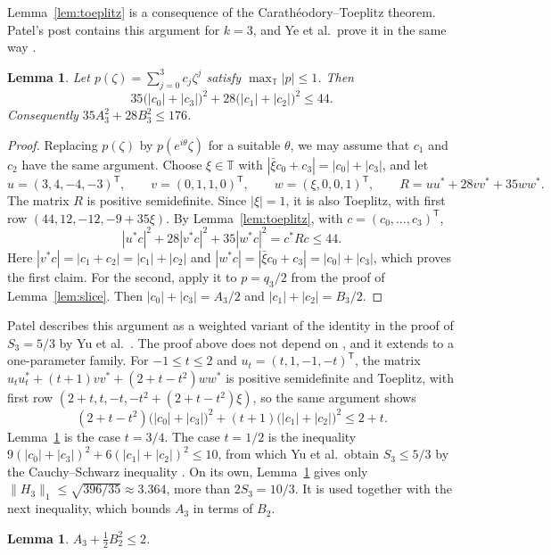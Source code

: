 \documentclass[11pt]{amsart}
\newtheorem{lemma}[theorem]{Lemma}
\theoremstyle{remark}
\numberwithin{equation}{section}
\newcommand{\T}{\mathbb{T}}
\begin{document}
Lemma~\ref{lem:toeplitz} is a consequence of the Carath\'eodory--Toeplitz theorem. Patel's post contains this argument for $k=3$, and Ye et al.\ prove it in the same way \cite[Lemma~3.1]{Ye26}.

\begin{lemma}\label{lem:cubic}
Let $p(\zeta)=\sum_{j=0}^3c_j\zeta^j$ satisfy $\max_\T|p|\le1$. Then
\[
35\bigl(|c_0|+|c_3|\bigr)^2+28\bigl(|c_1|+|c_2|\bigr)^2\le44.
\]
Consequently $35A_3^2+28B_3^2\le176$.
\end{lemma}

\begin{proof}
Replacing $p(\zeta)$ by $p(e^{i\theta}\zeta)$ for a suitable $\theta$, we may assume that $c_1$ and $c_2$ have the same argument. Choose $\xi\in\T$ with $|\bar\xi c_0+c_3|=|c_0|+|c_3|$, and let
\[
u=(3,4,-4,-3)^{\mathsf T},\qquad v=(0,1,1,0)^{\mathsf T},\qquad w=(\xi,0,0,1)^{\mathsf T},\qquad R=uu^*+28vv^*+35ww^*.
\]
The matrix $R$ is positive semidefinite. Since $|\xi|=1$, it is also Toeplitz, with first row $(44,12,-12,-9+35\xi)$. By Lemma~\ref{lem:toeplitz}, with $c=(c_0,\dots,c_3)^{\mathsf T}$,
\[
|u^*c|^2+28|v^*c|^2+35|w^*c|^2=c^*Rc\le44.
\]
Here $|v^*c|=|c_1+c_2|=|c_1|+|c_2|$ and $|w^*c|=|\bar\xi c_0+c_3|=|c_0|+|c_3|$, which proves the first claim. For the second, apply it to $p=q_3/2$ from the proof of Lemma~\ref{lem:slice}. Then $|c_0|+|c_3|=A_3/2$ and $|c_1|+|c_2|=B_3/2$.
\end{proof}

Patel describes this argument as a weighted variant of the identity in the proof of $S_3=5/3$ by Yu et al.\ \cite{Yu26}. The proof above does not depend on \cite{Yu26}, and it extends to a one-parameter family. For $-1\le t\le2$ and $u_t=(t,1,-1,-t)^{\mathsf T}$, the matrix $u_tu_t^*+(t+1)vv^*+(2+t-t^2)ww^*$ is positive semidefinite and Toeplitz, with first row $(2+t,t,-t,-t^2+(2+t-t^2)\xi)$, so the same argument shows
\[
(2+t-t^2)\bigl(|c_0|+|c_3|\bigr)^2+(t+1)\bigl(|c_1|+|c_2|\bigr)^2\le2+t.
\]
Lemma~\ref{lem:cubic} is the case $t=3/4$. The case $t=1/2$ is the inequality $9(|c_0|+|c_3|)^2+6(|c_1|+|c_2|)^2\le10$, from which Yu et al.\ obtain $S_3\le5/3$ by the Cauchy--Schwarz inequality \cite[(6)]{Yu26}. On its own, Lemma~\ref{lem:cubic} gives only $\|H_3\|_1\le\sqrt{396/35}\approx3.364$, more than $2S_3=10/3$. It is used together with the next inequality, which bounds $A_3$ in terms of $B_2$.

\begin{lemma}\label{lem:couple}
$A_3+\tfrac12B_2^2\le2$.
\end{lemma}
\end{document}
